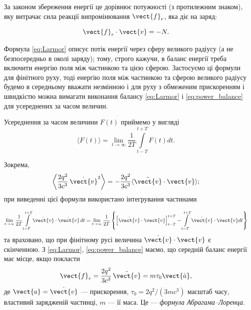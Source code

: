 За законом збереження енергії це дорівнює потужності (з протилежним знаком), яку витрачає сила реакції випромінювання $\vect{f}_{r}$, яка діє на заряд:

\begin{equation}\label{eq:power_balance}
\vect{f}_{r} \cdot \vect{v} = -N.
\end{equation}

Формула \eqref{eq:Larmor} описує потік енергії через сферу великого радіусу (а не безпосередньо в околі заряду); тому, строго кажучи, в баланс енергії треба включити енергію поля між частинкою та цією сферою.  Застосуємо ці формули для фінітного руху, тоді енергію поля між частинкою та сферою великого радіусу будемо в середньому вважати незмінною і для руху з обмеженим прискоренням і швидкістю можна вимагати виконання балансу \eqref{eq:Larmor} і \eqref{eq:power_balance}  для усереднених за часом величин.

Усереднення за часом величини $F(t)$ приймемо у вигляді
\begin{equation*}
\langle F(t) \rangle=\lim\limits_{t\to\infty}\frac{1}{2T}\int\limits_{t-T}^{t+T}F(t)dt.
\end{equation*}

Зокрема,
\begin{equation}
 \left\langle \frac{2q^2}{3c^3}\,\dot{\vect{v}}^2 \right\rangle = -\frac{2q^2}{3c^3} \langle \ddot{\vect{v}}\cdot\vect{v} \rangle;
\end{equation}
при виведенні цієї формули використано інтегрування частинами

\begin{equation}
\lim\limits_{t\to\infty}
\frac{1}{2T}\int\limits_{t-T}^{t+T}
\dot{\vect{v}}\cdot \dot{\vect{v}}\, dt
=
\lim\limits_{t\to\infty}
\frac{1}{2T}\left\{\left[\dot{ \vect{v}}\cdot \vect{v}\right]_{t-T}^{t+T} -\int\limits_{t-T}^{t+T}\ddot{ \vect{v}}\cdot  \vect{v}dt\right\}
\end{equation}
та враховано, що при фінітному русі величина $\dot{ \vect{v}}\cdot \vect{v}$ є скінченною.
З \eqref{eq:Larmor}, \eqref{eq:power_balance} маємо, що середній баланс енергії має місце, якщо покласти
\begin{equation}\label{eq:AL_force}
\vect{f}_{r} = \frac{2q^2}{3c^3}\,\ddot{\vect{v}}=m\tau_0\vect{\dot a},
\end{equation}
де $\vect{a} = \dot{\vect{v}}$ --- прискорення, $\tau_0 = 2q^2/(3mc^3)$ масштаб часу, властивий зарядженій частинці, $m$ --- її маса. Це --- \emph{формула Абрагама–Лоренца}.

